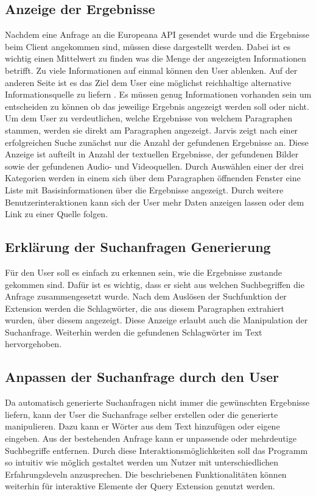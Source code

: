  \subsection{Anzeige der Ergebnisse}
 Nachdem eine Anfrage an die Europeana API gesendet wurde und die Ergebnisse beim Client angekommen sind, müssen diese dargestellt werden. Dabei ist es wichtig einen Mittelwert zu finden was die Menge der angezeigten Informationen betrifft. Zu viele Informationen auf einmal können den User ablenken. Auf der anderen Seite ist es das Ziel dem User eine möglichst reichhaltige alternative Informationsquelle zu liefern \cite{rhodes2000margin}. Es müssen genug Informationen vorhanden sein um entscheiden zu können ob das jeweilige Ergebnis angezeigt werden soll oder nicht. Um dem User zu verdeutlichen, welche Ergebnisse von welchem Paragraphen stammen, werden sie direkt am Paragraphen angezeigt. Jarvis zeigt nach einer erfolgreichen Suche zunächst nur die Anzahl der gefundenen Ergebnisse an. Diese Anzeige ist aufteilt in Anzahl der textuellen Ergebnisse, der gefundenen Bilder sowie der gefundenen Audio- und Videoquellen. Durch Auswählen einer der drei Kategorien werden in einem sich über dem Paragraphen öffnenden Fenster eine Liste mit Basisinformationen über die Ergebnisse angezeigt. Durch weitere Benutzerinteraktionen kann sich der User mehr Daten anzeigen lassen oder dem Link zu einer Quelle folgen.

 \subsection{Erklärung der Suchanfragen Generierung}
 Für den User soll es einfach zu erkennen sein, wie die Ergebnisse zustande gekommen sind. Dafür ist es wichtig, dass er sieht aus welchen Suchbegriffen die Anfrage zusammengesetzt wurde. Nach dem Auslösen der Suchfunktion der Extension werden die Schlagwörter, die aus diesem Paragraphen extrahiert wurden, über diesem angezeigt. Diese Anzeige erlaubt auch die Manipulation der Suchanfrage. Weiterhin werden die gefundenen Schlagwörter im Text hervorgehoben.

 \subsection{Anpassen der Suchanfrage durch den User}
 Da automatisch generierte Suchanfragen nicht immer die gewünschten Ergebnisse liefern, kann der User die Suchanfrage selber erstellen oder die generierte manipulieren. Dazu kann er Wörter aus dem Text hinzufügen oder eigene eingeben. Aus der bestehenden Anfrage kann er unpassende oder mehrdeutige Suchbegriffe entfernen. Durch diese Interaktionsmöglichkeiten soll das Programm so intuitiv wie möglich gestaltet werden um Nutzer mit unterschiedlichen Erfahrungsleveln anzusprechen. Die beschriebenen Funktionalitäten können weiterhin für interaktive Elemente der Query Extension genutzt werden.

